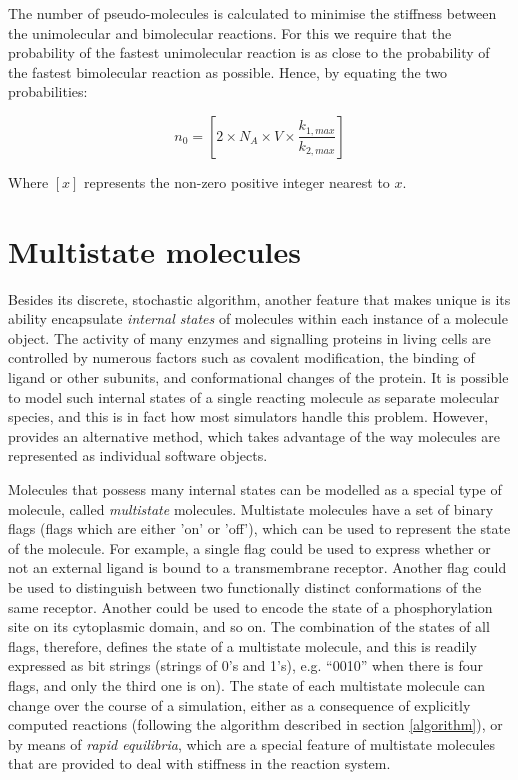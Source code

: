 The number of pseudo-molecules is calculated to minimise the stiffness
between the unimolecular and bimolecular reactions. For this we
require that the probability of the fastest unimolecular reaction is
as close to the probability of the fastest bimolecular reaction as
possible. Hence, by equating the two probabilities:

\begin{displaymath}
  n_0=[2\times{}N_A\times{}V\times{}\frac{k_{1,max}}{k_{2,max}}]
\end{displaymath}

Where $[x]$ represents the non-zero positive integer nearest to $x$.

\section{Multistate molecules}\label{intro_multistates}

Besides its discrete, stochastic algorithm, another feature that makes
\stochsim{} unique is its ability encapsulate \emph{internal states} of
molecules within each instance of a molecule object.  The activity of
many enzymes and signalling proteins in living cells are controlled by
numerous factors such as covalent modification, the binding of ligand
or other subunits, and conformational changes of the protein.  It is
possible to model such internal states of a single reacting molecule
as separate molecular species, and this is in fact how most simulators
handle this problem.  However, \stochsim{} provides an alternative
method, which takes advantage of the way molecules are represented as
individual software objects.\par

Molecules that possess many internal states can be modelled as a
special type of molecule, called \emph{multistate} molecules.
Multistate molecules have a set of binary flags (flags which are
either 'on' or 'off'), which can be used to represent the state of the
molecule.  For example, a single flag could be used to express whether
or not an external ligand is bound to a transmembrane receptor.
Another flag could be used to distinguish between two functionally
distinct conformations of the same receptor.  Another could be used to
encode the state of a phosphorylation site on its cytoplasmic domain,
and so on.  The combination of the states of all flags, therefore,
defines the state of a multistate molecule, and this is readily
expressed as bit strings (strings of 0's and 1's), e.g.  ``0010'' when
there is four flags, and only the third one is on).  The state of each
multistate molecule can change over the course of a simulation,
either as a consequence of explicitly computed reactions (following
the algorithm described in section \ref{algorithm}), or by means of
\emph{rapid equilibria}, which are a special feature of multistate
molecules that are provided to deal with stiffness in the reaction
system.

